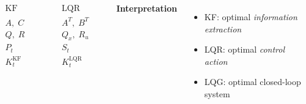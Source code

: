 {    %



    \begin{columns}[t]
        \vspace{-0.3cm}
        \[
        \boxed{
        \begin{array}{c|c}
        \text{KF (estimation)} & \text{LQR (control)}\\
        \hline
        A,\;C & A^T,\;B^T \\
        Q,\;R & Q_x,\;R_u \\
        P_t & S_t \\
        K_t^{\text{KF}} & K_t^{\text{LQR}}
        \end{array}
        }
        \]


        \textbf{Interpretation}

        \begin{itemize}
            \item KF: optimal \emph{information extraction}
            \item LQR: optimal \emph{control action}
            \item LQG: optimal closed-loop system
        \end{itemize}

    \end{columns}

}

